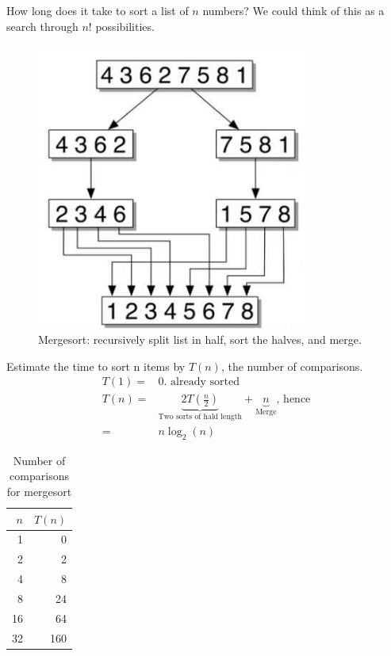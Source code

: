 \documentclass[]{article}
\begin{document}
How long does it take to sort a list of $n$ numbers? We could think of this as a search through $n!$ possibilities.

\begin{figure}[H]
	\caption{Mergesort: recursively split list in half, sort the halves, and merge.}\label{fig:mergesort}
	\includegraphics[width=0.8\textwidth]{mergesort}
\end{figure}

Estimate the time to sort n items by $T(n)$, the number of comparisons.
\begin{align*}
T(1) =& 0 \text{. already sorted}\\
T(n) =&\underbrace{ 2T(\frac{n}{2})}_\text{Two sorts of hald length} + \underbrace{n}_\text{Merge} \text{, hence}\\
=& n \log_2(n)
\end{align*}

\begin{table}[H]
	\begin{center}
		\caption{Number of comparisons for mergesort}
		\begin{tabular}{|r|r|} \hline
			$n$&$T(n)$  \\ \hline
			1& 0\\ \hline
			2&2 \\ \hline
			4&8 \\ \hline
			8& 24\\ \hline
			16& 64\\ \hline
			32& 160\\ \hline
		\end{tabular}
	\end{center}
\end{table}
\end{document}
